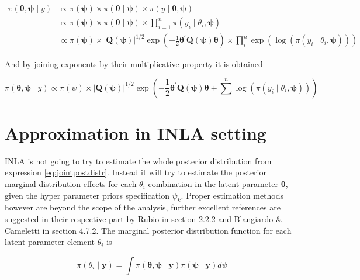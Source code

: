 \documentclass[
  12pt,
  a4paper,
  oneside]{book}
\theoremstyle{definition}
\theoremstyle{definition}
\theoremstyle{definition}
\theoremstyle{remark}
\begin{document}
\[
\begin{aligned}
\pi(\boldsymbol{\theta}, \boldsymbol{\psi} \mid y) & \propto \pi(\boldsymbol{\psi}) \times \pi(\boldsymbol{\theta} \mid \boldsymbol{\psi}) \times \pi(y \mid \boldsymbol{\theta}, \boldsymbol{\psi}) \\
& \propto \pi(\boldsymbol{\psi}) \times \pi(\boldsymbol{\theta} \mid \boldsymbol{\psi}) \times \prod_{i=1}^{n} \pi\left(y_{i} \mid \theta_{i}, \boldsymbol{\psi}\right) \\
& \propto \pi(\boldsymbol{\psi}) \times|\boldsymbol{Q}(\boldsymbol{\psi})|^{1 / 2} \exp \left(-\frac{1}{2} \boldsymbol{\theta}^{\prime} \boldsymbol{Q}(\boldsymbol{\psi}) \boldsymbol{\theta}\right) \times \prod_{i}^{n} \exp \left(\log \left(\pi\left(y_{i} \mid \theta_{i}, \boldsymbol{\psi}\right)\right)\right)
\end{aligned}
\]

And by joining exponents by their multiplicative property it is obtained

\begin{equation}
\pi(\boldsymbol{\theta}, \boldsymbol{\psi} \mid y) \propto \pi(\psi) \times|\boldsymbol{Q}(\boldsymbol{\psi})|^{1 / 2} \exp \left(-\frac{1}{2} \boldsymbol{\theta}^{\prime} \boldsymbol{Q}(\boldsymbol{\psi}) \boldsymbol{\theta}+\sum^{n} \log \left(\pi\left(y_{i} \mid \theta_{i}, \boldsymbol{\psi}\right)\right)\right)
\label{eq:jointpostdistr}
\end{equation}

\hypertarget{approx}{%
\section{Approximation in INLA setting}\label{approx}}

INLA is not going to try to estimate the whole posterior distribution from expression \eqref{eq:jointpostdistr}. Instead it will try to estimate the posterior marginal distribution effects for each \(\theta_{i}\) combination in the latent parameter \(\boldsymbol{\theta}\), given the hyper parameter priors specification \(\psi_{k}\). Proper estimation methods however are beyond the scope of the analysis, further excellent references are suggested in their respective part by Rubio \citeyearpar{Bayesian_INLA_Rubio} in section 2.2.2 and Blangiardo \& Cameletti \citeyearpar{Blangiardo-Cameletti} in section 4.7.2.
The marginal posterior distribution function for each latent parameter element \(\theta_{i}\) is

\begin{equation}
  \pi(\theta_{i} \mid \boldsymbol{y})=\int \pi(\boldsymbol{\theta}, \boldsymbol{\psi} \mid \mathbf{y}) \pi(\boldsymbol{\psi} \mid \mathbf{y}) d \psi
\label{eq:latentparam}
\end{equation}
\end{document}
